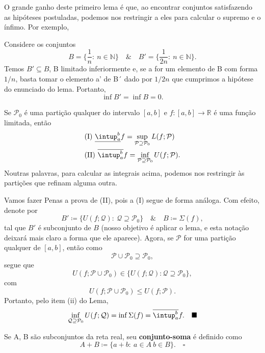 \documentclass[../analysisII_notes.tex]{subfiles}
\begin{document}
O grande ganho deste primeiro lema é que, ao encontrar conjuntos satisfazendo as hipóteses postuladas, podemos nos restringir a eles para calcular o supremo e o ínfimo. Por exemplo,
\begin{example}
	Considere os conjuntos
	\[
		B=\biggl\{\frac{1}{n}:\: n\in \mathbb{N}\biggr\} \quad\&\quad B'=\biggl\{\frac{1}{2n}:\: n\in \mathbb{N}\biggr\}.
	\]
	Temos \(B'\subseteq B\), B limitado inferiormente e, se a for um elemento de B com forma \(1/n\), basta tomar o elemento a' de B´ dado por \(1/2n\) que cumprimos a hipótese do enunciado do lema. Portanto,
	\[
		\inf_{}B' = \inf_{}B = 0.
	\]
\end{example}
\begin{theorem*}
	Se \(\mathcal{P}_{0}\) é uma partição qualquer do intervalo \([a, b]\) e \(f:[a, b]\rightarrow \mathbb{R}\) é uma função limitada, então
	\begin{align*}
		 & \text{(I) } \underline{\intup_{a}^{b}}f = \sup_{\mathcal{P}\supseteq \mathcal{P}_{0}}L(f; \mathcal{P})  \\
		 & \text{(II) } \overline{\intup_{a}^{b}}f = \inf_{\mathcal{P}\supseteq \mathcal{P}_{0}}U(f; \mathcal{P}).
	\end{align*}
	Noutras palavras, para calcular as integrais acima, podemos nos restringir às partições que refinam alguma outra.
\end{theorem*}
\begin{proof*}
	Vamos fazer Penas a prova de (II), pois a (I) segue de forma análoga. Com efeito, denote por
	\[
		B'\coloneqq \{U(f; \mathcal{Q}):\: \mathcal{Q}\supseteq \mathcal{P}_{0}\} \quad\&\quad B\coloneqq \Sigma (f),
	\]
	tal que \(B'\) é subconjunto de \(B\) (nosso objetivo é aplicar o lema, e esta notação deixará mais claro a forma que ele aparece). Agora, se \(\mathcal{P}\) for uma partição qualquer de \([a, b]\), então como
	\[
		\mathcal{P}\cup \mathcal{P}_{0}\supseteq \mathcal{P}_{0},
	\]
	segue que
	\[
		U(f; \mathcal{P}\cup \mathcal{P}_{0})\in \{U(f; \mathcal{Q}): \mathcal{Q}\supseteq \mathcal{P}_{0}\},
	\]
	com
	\[
		U(f; \mathcal{P}\cup \mathcal{P}_{0}) \leq U(f; \mathcal{P}).
	\]
	Portanto, pelo item (ii) do Lema,
	\[
		\inf_{\mathcal{Q}\supseteq \mathcal{P}_{0}}U(f; \mathcal{Q}) = \inf_{}\Sigma (f)=\overline{\intup_{a}^{b}}f.\quad \text{\qedsymbol}
	\]
\end{proof*}
\begin{def*}
	Se A, B são subconjuntos da reta real, seu \textbf{conjunto-soma} é definido como
	\[
		A+B\coloneqq \{a+b:\:a\in A\:b\in B\}.\quad \square
	\]
\end{def*}
\end{document}
